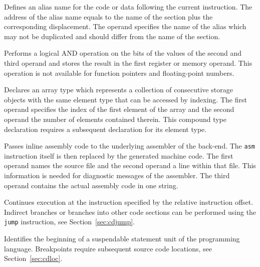 
Defines an alias name for the code or data following the current instruction.
The address of the alias name equals to the name of the section plus the corresponding displacement.
The operand specifies the name of the alias which may not be duplicated and should differ from the name of the section.


Performs a logical AND operation on the bits of the values of the second and third operand and stores the result in the first register or memory operand.
This operation is not available for function pointers and floating-point numbers.


Declares an array type which represents a collection of consecutive storage objects with the same element type that can be accessed by indexing.
The first operand specifies the index of the first element of the array and the second operand the number of elements contained therein.
This compound type declaration requires a subsequent declaration for its element type.


Passes inline assembly code to the underlying assembler of the back-end.
The \texttt{asm} instruction itself is then replaced by the generated machine code.
The first operand names the source file and the second operand a line within that file.
This information is needed for diagnostic messages of the assembler.
The third operand contains the actual assembly code in one string.
\seeassembly


Continues execution at the instruction specified by the relative instruction offset.
Indirect branches or branches into other code sections can be performed using the \texttt{jump} instruction, see Section~\ref{sec:cdjump}.


Identifies the beginning of a suspendable statement unit of the programming language.
Breakpoints require subsequent source code locations, see Section~\ref{sec:cdloc}.


